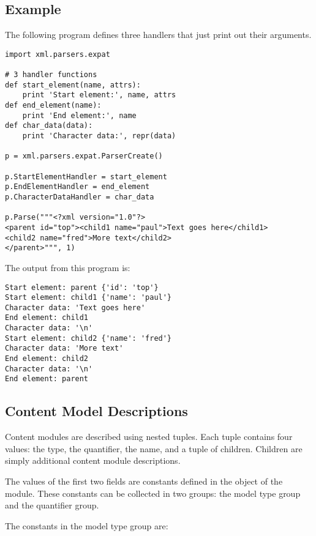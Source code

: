 \subsection{Example \label{expat-example}}

The following program defines three handlers that just print out their
arguments.

\begin{verbatim}
import xml.parsers.expat

# 3 handler functions
def start_element(name, attrs):
    print 'Start element:', name, attrs
def end_element(name):
    print 'End element:', name
def char_data(data):
    print 'Character data:', repr(data)

p = xml.parsers.expat.ParserCreate()

p.StartElementHandler = start_element
p.EndElementHandler = end_element
p.CharacterDataHandler = char_data

p.Parse("""<?xml version="1.0"?>
<parent id="top"><child1 name="paul">Text goes here</child1>
<child2 name="fred">More text</child2>
</parent>""", 1)
\end{verbatim}

The output from this program is:

\begin{verbatim}
Start element: parent {'id': 'top'}
Start element: child1 {'name': 'paul'}
Character data: 'Text goes here'
End element: child1
Character data: '\n'
Start element: child2 {'name': 'fred'}
Character data: 'More text'
End element: child2
Character data: '\n'
End element: parent
\end{verbatim}


\subsection{Content Model Descriptions \label{expat-content-models}}

Content modules are described using nested tuples.  Each tuple
contains four values: the type, the quantifier, the name, and a tuple
of children.  Children are simply additional content module
descriptions.

The values of the first two fields are constants defined in the
 object of the  module.  These
constants can be collected in two groups: the model type group and the
quantifier group.

The constants in the model type group are:

